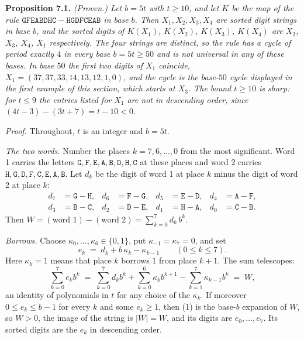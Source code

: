 \documentclass[11pt,letterpaper]{article}
\theoremstyle{paperstyle}
\theoremstyle{paperstyledef}
\theoremstyle{paperstylerem}
\begin{document}
\textbf{Proposition 7.1.} \emph{(Proven.) Let \(b = 5t\) with \(t \geq 10\), and let \(K\) be the map of the rule \(\mathtt{GFEABDHC} - \mathtt{HGDFCEAB}\) in base \(b\). Then \(X_1, X_2, X_3, X_4\) are sorted digit strings in base \(b\), and the sorted digits of \(K(X_1)\), \(K(X_2)\), \(K(X_3)\), \(K(X_4)\) are \(X_2\), \(X_3\), \(X_4\), \(X_1\) respectively. The four strings are distinct, so the rule has a cycle of period exactly \(4\) in every base \(b = 5t \geq 50\) and is not universal in any of these bases. In base \(50\) the first two digits of \(X_1\) coincide, \(X_1 = (37,37,33,14,13,12,1,0)\), and the cycle is the base-\(50\) cycle displayed in the first example of this section, which starts at \(X_3\). The bound \(t \geq 10\) is sharp: for \(t \leq 9\) the entries listed for \(X_1\) are not in descending order, since \((4t-3) - (3t+7) = t - 10 < 0\).}

\emph{Proof.} Throughout, \(t\) is an integer and \(b = 5t\).

\emph{The two words.} Number the places \(k = 7, 6, \dots, 0\) from the most significant. Word 1 carries the letters \(\mathtt{G}, \mathtt{F}, \mathtt{E}, \mathtt{A}, \mathtt{B}, \mathtt{D}, \mathtt{H}, \mathtt{C}\) at these places and word 2 carries \(\mathtt{H}, \mathtt{G}, \mathtt{D}, \mathtt{F}, \mathtt{C}, \mathtt{E}, \mathtt{A}, \mathtt{B}\). Let \(d_k\) be the digit of word 1 at place \(k\) minus the digit of word 2 at place \(k\): \[\begin{aligned}
d_7 &= \mathtt{G}-\mathtt{H}, & d_6 &= \mathtt{F}-\mathtt{G}, & d_5 &= \mathtt{E}-\mathtt{D}, & d_4 &= \mathtt{A}-\mathtt{F},\\
d_3 &= \mathtt{B}-\mathtt{C}, & d_2 &= \mathtt{D}-\mathtt{E}, & d_1 &= \mathtt{H}-\mathtt{A}, & d_0 &= \mathtt{C}-\mathtt{B}.
\end{aligned}\] Then \(W = (\text{word } 1) - (\text{word } 2) = \sum_{k=0}^{7} d_k\, b^k\).

\emph{Borrows.} Choose \(\kappa_0, \dots, \kappa_6 \in \{0, 1\}\), put \(\kappa_{-1} = \kappa_7 = 0\), and set \[e_k \;=\; d_k + b\,\kappa_k - \kappa_{k-1} \qquad (0 \leq k \leq 7).\] Here \(\kappa_k = 1\) means that place \(k\) borrows \(1\) from place \(k+1\). The sum telescopes: \[\sum_{k=0}^{7} e_k b^k \;=\; \sum_{k=0}^{7} d_k b^k + \sum_{k=0}^{6} \kappa_k b^{k+1} - \sum_{k=1}^{7} \kappa_{k-1} b^{k} \;=\; W, \tag{1}\] an identity of polynomials in \(t\) for any choice of the \(\kappa_k\). If moreover \(0 \leq e_k \leq b-1\) for every \(k\) and some \(e_k \geq 1\), then (1) is the base-\(b\) expansion of \(W\), so \(W > 0\), the image of the string is \(|W| = W\), and its digits are \(e_0, \dots, e_7\). Its sorted digits are the \(e_k\) in descending order.
\end{document}
